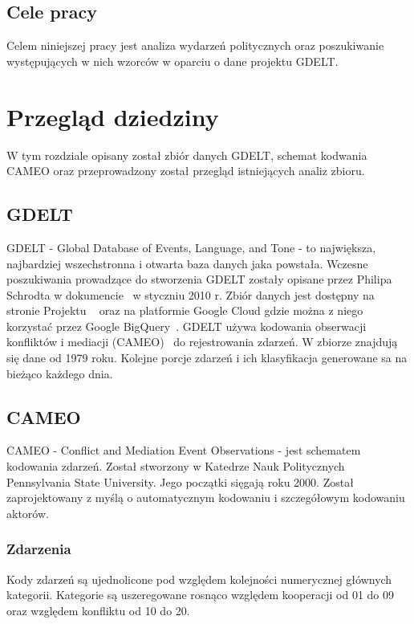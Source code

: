 \documentclass[11pt]{report}
\begin{document}
    \section{Cele pracy}
    Celem niniejszej pracy jest analiza wydarzeń politycznych oraz poszukiwanie występujących w nich wzorców w oparciu o dane projektu GDELT.


    \chapter{Przegląd dziedziny}
    W tym rozdziale opisany został zbiór danych GDELT, schemat kodwania CAMEO oraz przeprowadzony został przegląd istniejących analiz zbioru.


    \section{GDELT}
    GDELT - Global Database of Events, Language, and Tone - to największa, najbardziej wszechstronna i otwarta baza danych jaka powstała.
    Wczesne poszukiwania prowadzące do stworzenia GDELT zostały opisane przez Philipa Schrodta w dokumencie~\cite{Schrodt2010} w styczniu 2010 r.
    Zbiór danych jest dostępny na stronie Projektu ~\cite{gdelt} oraz na platformie Google Cloud gdzie można z niego korzystać przez Google BigQuery~\cite{BigQuery2014}.
    GDELT używa kodowania obserwacji konfliktów i mediacji (CAMEO)~\cite{GDELTDocumentation} do rejestrowania zdarzeń.
    W zbiorze znajdują się dane od 1979 roku.
    Kolejne porcje zdarzeń i ich klasyfikacja generowane sa na bieżąco każdego dnia.


    \section{CAMEO}
    CAMEO - Conflict and Mediation Event Observations - jest schematem kodowania zdarzeń.
    Został stworzony w Katedrze Nauk Politycznych Pennsylvania State University.
    Jego początki sięgają roku 2000.
    Został zaprojektowany z myślą o automatycznym kodowaniu i szczegółowym kodowaniu aktorów.

    \subsection{Zdarzenia}
    Kody zdarzeń są ujednolicone pod względem kolejności numerycznej głównych kategorii.
    Kategorie są uszeregowane rosnąco względem kooperacji od 01 do 09 oraz względem konfliktu od 10 do 20.
\end{document}
